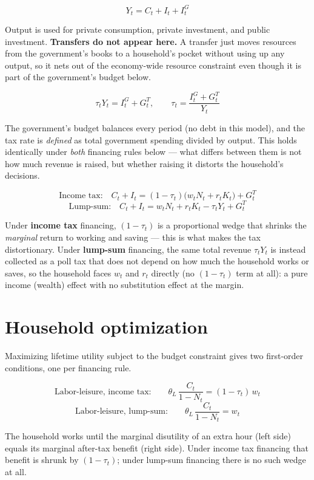 \documentclass[11pt]{article}
\newcommand{\eq}[1]{\begin{equation}#1\end{equation}}
\begin{document}
\eq{ Y_t = C_t + I_t + I^G_t }

Output is used for private consumption, private investment, and public
investment. \textbf{Transfers do not appear here.} A transfer just moves
resources from the government's books to a household's pocket without using
up any output, so it nets out of the economy-wide resource constraint even
though it is part of the government's budget below.

\eq{ \tau_t Y_t = I^G_t + G^T_t, \qquad \tau_t = \frac{I^G_t+G^T_t}{Y_t} }

The government's budget balances every period (no debt in this model), and
the tax rate is \emph{defined} as total government spending divided by
output. This holds identically under \emph{both} financing rules below ---
what differs between them is not how much revenue is raised, but whether
raising it distorts the household's decisions.

\eq{ \text{Income tax:}\quad C_t+I_t = (1-\tau_t)\big(w_tN_t+r_tK_t\big) + G^T_t }
\eq{ \text{Lump-sum:}\quad C_t+I_t = w_tN_t+r_tK_t - \tau_tY_t + G^T_t }

Under \textbf{income tax} financing, $(1-\tau_t)$ is a proportional wedge
that shrinks the \emph{marginal} return to working and saving --- this is
what makes the tax distortionary. Under \textbf{lump-sum} financing, the
same total revenue $\tau_t Y_t$ is instead collected as a poll tax that does
not depend on how much the household works or saves, so the household faces
$w_t$ and $r_t$ directly (no $(1-\tau_t)$ term at all): a pure income
(wealth) effect with no substitution effect at the margin.

\section{Household optimization}

Maximizing lifetime utility subject to the budget constraint gives two
first-order conditions, one per financing rule.

\eq{ \text{Labor-leisure, income tax:}\qquad \theta_L\,\frac{C_t}{1-N_t} = (1-\tau_t)\,w_t }
\eq{ \text{Labor-leisure, lump-sum:}\qquad \theta_L\,\frac{C_t}{1-N_t} = w_t }

The household works until the marginal disutility of an extra hour (left
side) equals its marginal after-tax benefit (right side). Under income tax
financing that benefit is shrunk by $(1-\tau_t)$; under lump-sum financing
there is no such wedge at all.
\end{document}
